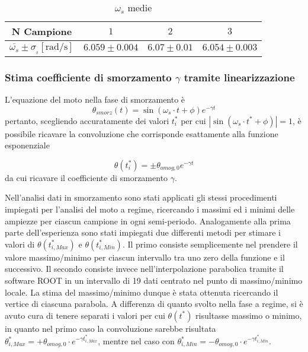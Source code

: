 \documentclass[a4paper,11pt,oneside]{article}
\begin{document}
\begin{table}[h!]
    \centering
    \begin{tabular}{|c|c|c|c|}
        \hline
        \textbf{N Campione} & $1$ & $2$ & $3$\\ \hline
        \rowcolor[rgb]{0.85,0.85,0.85}\textbf{$\overline{\omega_s}\pm \sigma_{\overline{_{s}}} [\si{\radian\per\second}]$} & $6.059\pm0.004$ & $6.07\pm0.01$ & $6.054\pm0.003$\\ \hline
    \end{tabular}
    \caption{$\omega_s$ medie}
    \label{tab:omega_s_medie}
\end{table}


\subsubsection{Stima coefficiente di smorzamento $\gamma$ tramite linearizzazione}
L'equazione del moto nella fase di smorzamento è
\begin{equation*}
    \theta_{smorz}(t)=\sin{(\omega_{s}\cdot t + \phi )} e^{-\gamma t}
\end{equation*}
pertanto, scegliendo accuratamente dei valori $t^{\ast}_{i}$ per cui $| \sin{(\omega_{s} \cdot t^{\ast} + \phi)} |=1$, è possibile ricavare la convoluzione che corrisponde esattamente alla funzione esponenziale

\begin{equation*}
\theta(t_{i}^{\ast})=\pm \theta_{omog, 0} e^{-\gamma t}
\end{equation*}
da cui ricavare il coefficiente di smorzamento $\gamma$.\newline

Nell'analisi dati in smorzamento sono stati applicati gli stessi procedimenti impiegati per l'analisi del moto a regime, ricercando i massimi ed i minimi delle ampiezze per ciascun campione in ogni semi-periodo. Analogamente alla prima parte dell'esperienza sono stati impiegati due differenti metodi per stimare i valori di $\theta(t^{\ast}_{i, Max})$ e $\theta(t^{\ast}_{i, Min})$. Il primo consiste semplicemente nel prendere il valore massimo/minimo per ciascun intervallo tra uno zero della funzione e il successivo. Il secondo consiste invece nell'interpolazione parabolica tramite il software ROOT in un intervallo di 19 dati centrato nel punto di massimo/minimo locale. La stima del massimo/minimo dunque è stata ottenuta ricercando il vertice di ciascuna parabola. 
A differenza di quanto svolto nella fase a regime, si è avuto cura di tenere separati i valori per cui $\theta(t^{\ast})$ risultasse massimo o minimo, in quanto nel primo caso la convoluzione sarebbe risultata $\theta^{\ast}_{i, Max}=+\theta_{omog, 0}\cdot e^{- \gamma t^{\ast}_{i, Max}}$, mentre nel caso con $\theta^{\ast}_{i, Min}=-\theta_{omog, 0}\cdot e^{-\gamma t^{\ast}_{i, Min}}$.\\
\end{document}
